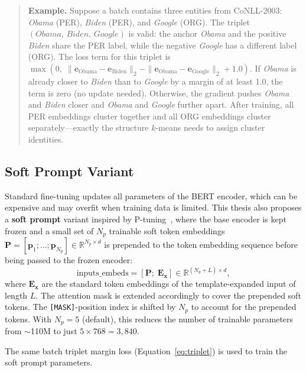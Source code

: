 \documentclass[14pt]{extreport}
\begin{document}
\begin{quote}\small
\textbf{Example.}
Suppose a batch contains three entities from CoNLL-2003: \textit{Obama} (PER), \textit{Biden} (PER), and \textit{Google} (ORG). The triplet $(\textit{Obama},\,\textit{Biden},\,\textit{Google})$ is valid: the anchor \textit{Obama} and the positive \textit{Biden} share the PER label, while the negative \textit{Google} has a different label (ORG). The loss term for this triplet is $\max(0,\;\|\mathbf{e}_{\text{Obama}}-\mathbf{e}_{\text{Biden}}\|_2 - \|\mathbf{e}_{\text{Obama}}-\mathbf{e}_{\text{Google}}\|_2 + 1.0)$. If \textit{Obama} is already closer to \textit{Biden} than to \textit{Google} by a margin of at least 1.0, the term is zero (no update needed). Otherwise, the gradient pushes \textit{Obama} and \textit{Biden} closer and \textit{Obama} and \textit{Google} further apart. After training, all PER embeddings cluster together and all ORG embeddings cluster separately---exactly the structure $k$-means needs to assign cluster identities.
\end{quote}

\subsection{Soft Prompt Variant}

Standard fine-tuning updates all parameters of the BERT encoder, which can be expensive and may overfit when training data is limited. This thesis also proposes a \textbf{soft prompt} variant inspired by P-tuning~\cite{liu-etal-2022-ptuning, lester-etal-2021-power}, where the base encoder is kept frozen and a small set of $N_p$ trainable soft token embeddings $\mathbf{P} = [\mathbf{p}_1; \ldots; \mathbf{p}_{N_p}] \in \mathbb{R}^{N_p \times d}$ is prepended to the token embedding sequence before being passed to the frozen encoder:
\begin{equation}
    \text{inputs\_embeds} = [\mathbf{P};\; \mathbf{E}_{\mathbf{x}}] \in \mathbb{R}^{(N_p + L) \times d},
    \label{eq:soft_prompt}
\end{equation}
where $\mathbf{E}_{\mathbf{x}}$ are the standard token embeddings of the template-expanded input of length $L$. The attention mask is extended accordingly to cover the prepended soft tokens. The \texttt{[MASK]}-position index is shifted by $N_p$ to account for the prepended tokens. With $N_p = 5$ (default), this reduces the number of trainable parameters from $\sim$110M to just $5 \times 768 = 3{,}840$.

The same batch triplet margin loss (Equation~\ref{eq:triplet}) is used to train the soft prompt parameters.
\end{document}
